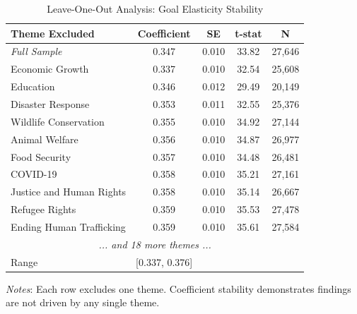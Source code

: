 \begin{table}[htbp]
\centering
\caption{Leave-One-Out Analysis: Goal Elasticity Stability}
\label{tab:leave_one_out}
\begin{threeparttable}
\begin{tabular}{lcccc}
\toprule
Theme Excluded & Coefficient & SE & t-stat & N \\
\midrule
\textit{Full Sample} & 0.347 & 0.010 & 33.82 & 27,646 \\
\addlinespace
Economic Growth & 0.337 & 0.010 & 32.54 & 25,608 \\
Education & 0.346 & 0.012 & 29.49 & 20,149 \\
Disaster Response & 0.353 & 0.011 & 32.55 & 25,376 \\
Wildlife Conservation & 0.355 & 0.010 & 34.92 & 27,144 \\
Animal Welfare & 0.356 & 0.010 & 34.87 & 26,977 \\
Food Security & 0.357 & 0.010 & 34.48 & 26,481 \\
COVID-19 & 0.358 & 0.010 & 35.21 & 27,161 \\
Justice and Human Rights & 0.358 & 0.010 & 35.14 & 26,667 \\
Refugee Rights & 0.359 & 0.010 & 35.53 & 27,478 \\
Ending Human Trafficking & 0.359 & 0.010 & 35.61 & 27,584 \\
\multicolumn{5}{c}{\textit{... and 18 more themes ...}} \\
\midrule
Range & [0.337, 0.376] & & & \\
\bottomrule
\end{tabular}
\begin{tablenotes}
\small
\item \textit{Notes}: Each row excludes one theme. Coefficient stability demonstrates findings are not driven by any single theme.
\end{tablenotes}
\end{threeparttable}
\end{table}

